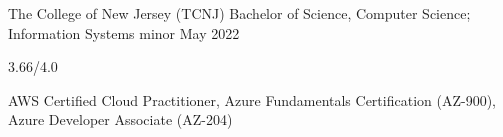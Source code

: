 
\begin{cventry}
    {The College of New Jersey (TCNJ)}
    {Bachelor of Science, Computer Science; Information Systems minor}
    {May 2022}{}{}
    \begin{cvitems}
        \item{} 3.66/4.0
        \item{} AWS Certified Cloud Practitioner, Azure Fundamentals Certification (AZ-900), Azure Developer Associate (AZ-204) 
    \end{cvitems}
\end{cventry}
